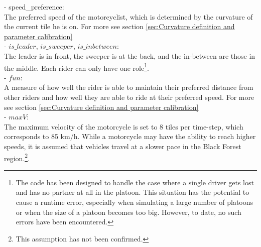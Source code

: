 \begin{itemize}
\begin{itemize}
          - speed\_preference:\\
          The preferred speed of the motorcyclist, which is determined by the curvature of the current tile he is on. For more see section \ref{sec:Curvature definition and parameter calibration}\\
          - $is\_leader$, $is\_sweeper$, $is\_inbetween$:\\
          The leader is in front, the sweeper is at the back, and the in-between are those in the middle. Each rider can only have one role\footnote{The code has been designed to handle the case where a single driver gets lost and has no partner at all in the platoon. This situation has the potential to cause a runtime error, especially when simulating a large number of platoons or when the size of a platoon becomes too big. However, to date, no such errors have been encountered.}.\\
          - $fun$:\\
          A measure of how well the rider is able to maintain their preferred distance from other riders and how well they are able to ride at their preferred speed. For more see section \ref{sec:Curvature definition and parameter calibration}\\
          - $maxV$:\\
          The maximum velocity of the motorcycle is set to 8 tiles per time-step, which corresponds to 85 km/h. While a motorcycle may have the ability to reach higher speeds, it is assumed that vehicles travel at a slower pace in the Black Forest region.\footnote{This assumption has not been confirmed.}.\\
          


\end{itemize}
\end{itemize}
